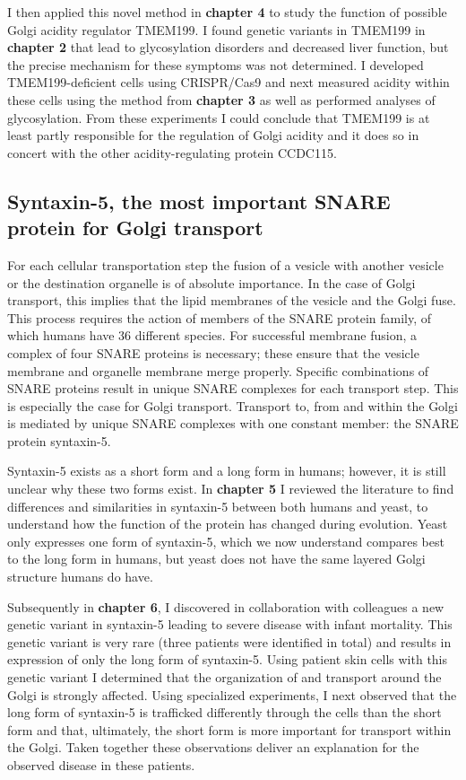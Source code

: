 I then applied this novel method in \textbf{chapter 4} to study the function of possible Golgi acidity regulator TMEM199. I found genetic variants in TMEM199 in \textbf{chapter 2} that lead to glycosylation disorders and decreased liver function, but the precise mechanism for these symptoms was not determined. I developed TMEM199-deficient cells using CRISPR/Cas9 and next measured acidity within these cells using the method from \textbf{chapter 3} as well as performed analyses of glycosylation. From these experiments I could conclude that TMEM199 is at least partly responsible for the regulation of Golgi acidity and it does so in concert with the other acidity-regulating protein CCDC115.

\subsection{Syntaxin-5, the most important SNARE protein for Golgi transport}
For each cellular transportation step the fusion of a vesicle with another vesicle or the destination organelle is of absolute importance. In the case of Golgi transport, this implies that the lipid membranes of the vesicle and the Golgi fuse. This process requires the action of members of the SNARE protein family, of which humans have 36 different species. For successful membrane fusion, a complex of four SNARE proteins is necessary; these ensure that the vesicle membrane and organelle membrane merge properly. Specific combinations of SNARE proteins result in unique SNARE complexes for each transport step. This is especially the case for Golgi transport. Transport to, from and within the Golgi is mediated by unique SNARE complexes with one constant member: the SNARE protein syntaxin-5.

Syntaxin-5 exists as a short form and a long form in humans; however, it is still unclear why these two forms exist. In \textbf{chapter 5} I reviewed the literature to find differences and similarities in syntaxin-5 between both humans and yeast, to understand how the function of the protein has changed during evolution. Yeast only expresses one form of syntaxin-5, which we now understand compares best to the long form in humans, but yeast does not have the same layered Golgi structure humans do have.

Subsequently in \textbf{chapter 6}, I discovered in collaboration with colleagues a new genetic variant in syntaxin-5 leading to severe disease with infant mortality. This genetic variant is very rare (three patients were identified in total) and results in expression of only the long form of syntaxin-5. Using patient skin cells with this genetic variant I determined that the organization of and transport around the Golgi is strongly affected. Using specialized experiments, I next observed that the long form of syntaxin-5 is trafficked differently through the cells than the short form and that, ultimately, the short form is more important for transport within the Golgi. Taken together these observations deliver an explanation for the observed disease in these patients.

